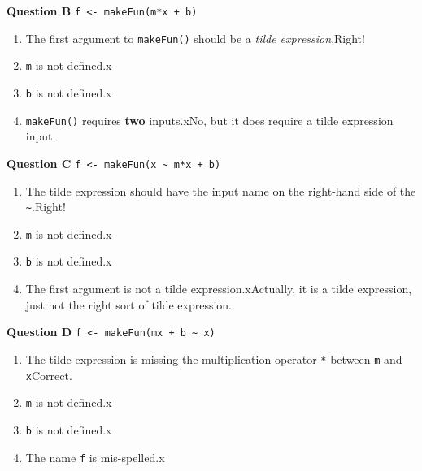 \documentclass[
  letterpaper,
  DIV=11,
  numbers=noendperiod,
  oneside]{article}
\providecommand{\tightlist}{%
  \setlength{\itemsep}{0pt}\setlength{\parskip}{0pt}}\usepackage{longtable,booktabs,array}
\begin{document}
\begin{multicols}{2}
\textbf{Question B} \texttt{f\ \textless{}-\ makeFun(m*x\ +\ b)}

\begin{enumerate}
\def\labelenumi{\roman{enumi}.}
\tightlist
\item
  {The first argument to \texttt{makeFun()} should be a \emph{tilde
  expression}.{Right!~}}\\
\item
  {\texttt{m} is not defined.{x}}\\
\item
  {\texttt{b} is not defined.{x}}\\
\item
  {\texttt{makeFun()} requires \textbf{two} inputs.{xNo, but it does
  require a tilde expression input.}}
\end{enumerate}

\textbf{Question C}
\texttt{f\ \textless{}-\ makeFun(x\ \textasciitilde{}\ m*x\ +\ b)}

\begin{enumerate}
\def\labelenumi{\roman{enumi}.}
\tightlist
\item
  {The tilde expression should have the input name on the right-hand
  side of the \texttt{\textasciitilde{}}.{Right!~}}\\
\item
  {\texttt{m} is not defined.{x}}\\
\item
  {\texttt{b} is not defined.{x}}\\
\item
  {The first argument is not a tilde expression.{xActually, it is a
  tilde expression, just not the right sort of tilde expression.}}
\end{enumerate}

\textbf{Question D}
\texttt{f\ \textless{}-\ makeFun(mx\ +\ b\ \textasciitilde{}\ x)}

\begin{enumerate}
\def\labelenumi{\roman{enumi}.}
\tightlist
\item
  {The tilde expression is missing the multiplication operator
  \texttt{*} between \texttt{m} and \texttt{x}{Correct.~}}\\
\item
  {\texttt{m} is not defined.{x}}\\
\item
  {\texttt{b} is not defined.{x}}\\
\item
  {The name \texttt{f} is mis-spelled.{x}}
\end{enumerate}


\end{multicols}
\end{document}

